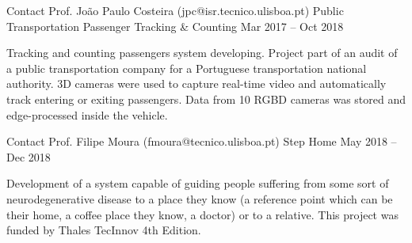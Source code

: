 \begin{cventries}
\cventrynograde
	{Contact Prof. João Paulo Costeira (jpc@isr.tecnico.ulisboa.pt)} %
	{Public Transportation Passenger Tracking \& Counting} %
	{Mar 2017 – Oct 2018} %
	{
		\begin{cvitems} %
			Tracking and counting passengers system developing. Project part of an audit of a public transportation company for a Portuguese transportation national authority.
			3D cameras were used to capture real-time video and automatically track entering or exiting passengers.
			Data from 10 RGBD cameras was stored and edge-processed inside the vehicle.
		\end{cvitems}
	}

\cventrynograde
{Contact Prof. Filipe Moura (fmoura@tecnico.ulisboa.pt)} %
{Step Home} %
{May 2018 – Dec 2018} %
{
	\begin{cvitems} %
		Development of a system capable of guiding people suffering from some sort of neurodegenerative disease to a place they know (a reference point which can be their home, a coffee place they know, a doctor) or to a relative. This project was funded by Thales TecInnov 4th Edition.
	\end{cvitems}
}



\end{cventries}